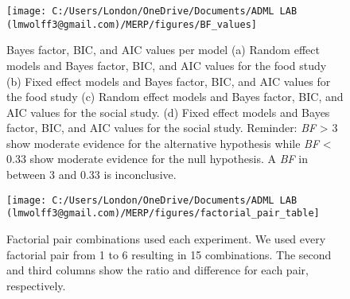 \documentclass[
  english,
  ,doc,floatsintext]{apa6}
\begin{document}
\begin{figure}

{\centering \texttt{[image: C:/Users/London/OneDrive/Documents/ADML LAB (lmwolff3@gmail.com)/MERP/figures/BF\_values]} 

}

\caption{Bayes factor, BIC, and AIC values per model (a) Random effect models and Bayes factor, BIC, and AIC values for the food study (b) Fixed effect models and Bayes factor, BIC, and AIC values for the food study (c) Random effect models and Bayes factor, BIC, and AIC values for the social study. (d) Fixed effect models and Bayes factor, BIC, and AIC values for the social study. Reminder: \emph{BF} \textgreater{} 3 show moderate evidence for the alternative hypothesis while \emph{BF} \textless{} 0.33 show moderate evidence for the null hypothesis. A \emph{BF} in between 3 and 0.33 is inconclusive.}\label{fig:bftable}
\end{figure}



\begin{figure}

{\centering \texttt{[image: C:/Users/London/OneDrive/Documents/ADML LAB (lmwolff3@gmail.com)/MERP/figures/factorial\_pair\_table]} 

}

\caption{Factorial pair combinations used each experiment. We used every factorial pair from 1 to 6 resulting in 15 combinations. The second and third columns show the ratio and difference for each pair, respectively.}\label{fig:pairstable}
\end{figure}
\end{document}
